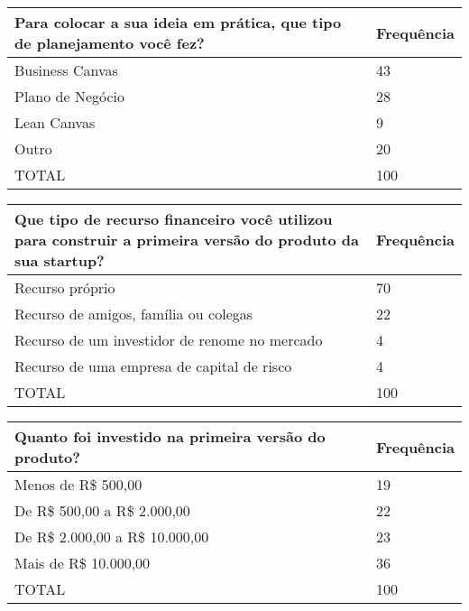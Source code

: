 \begin{table*}[hb]
\centering
\caption{Planejamento feito para viabilizar a execu\c{c}\~ao da ideia}
\label{tab:pergunta3}
\begin{tabular}{|p{10cm}|p{2cm}|}
\hline{\bf Para colocar a sua ideia em pr\'atica, que tipo de planejamento voc\^e fez?} & {\bf Frequ\^encia}\\
\hline Business Canvas & 43\\
\hline Plano de Neg\'ocio & 28\\
\hline Lean Canvas & 9\\
\hline Outro & 20\\
\hline TOTAL & 100\\
\hline
\end{tabular}
\end{table*}

\begin{table*}[hb]
\centering
\caption{Tipos de recurso financeiro utilizados pelas \emph{startups}}
\label{tab:pergunta4}
\begin{tabular}{|p{10cm}|p{2cm}|}
\hline{\bf Que tipo de recurso financeiro voc\^e utilizou para construir a primeira vers\~ao do produto da sua startup?} & {\bf Frequ\^encia}\\
\hline Recurso pr\'oprio & 70\\
\hline Recurso de amigos, fam\'ilia ou colegas & 22\\
\hline Recurso de um investidor de renome no mercado & 4\\
\hline Recurso de uma empresa de capital de risco & 4\\
\hline TOTAL & 100\\
\hline
\end{tabular}
\end{table*}

\begin{table*}[hb]
\centering
\caption{Investimento necess\'ario \`a constru\c{c}\~ao da primeira vers\~ao do produto}
\label{tab:pergunta5}
\begin{tabular}{|p{10cm}|p{2cm}|}
\hline{\bf Quanto foi investido na primeira vers\~ao do produto?} & {\bf Frequ\^encia}\\
\hline Menos de R\$ 500,00 & 19\\
\hline De R\$ 500,00 a R\$ 2.000,00 & 22\\
\hline De R\$ 2.000,00 a R\$ 10.000,00 & 23\\
\hline Mais de R\$ 10.000,00 & 36\\
\hline TOTAL & 100\\
\hline
\end{tabular}
\end{table*}

